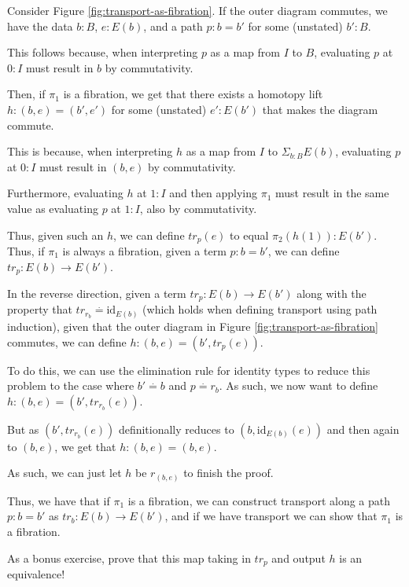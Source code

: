 \documentclass{amsart}
\theoremstyle{definition}
\newcommand{\defeq}{\ensuremath{\overset{\boldsymbol{\cdot}}{=}}}
\begin{document}
Consider Figure \ref{fig:transport-as-fibration}. If the outer diagram commutes, we have the data $b : B$, $e : E(b)$, and a path $p : b = b'$ for some (unstated) $b' : B$.

This follows because, when interpreting $p$ as a map from $I$ to $B$, evaluating $p$ at $0 : I$ must result in $b$ by commutativity.

Then, if $\pi_1$ is a fibration, we get that there exists a homotopy lift $h : (b, e) = (b', e')$ for some (unstated) $e' : E(b')$ that makes the diagram commute.

This is because, when interpreting $h$ as a map from $I$ to $\Sigma_{b : B} E(b)$, evaluating $p$ at $0 : I$ must result in $(b, e)$ by commutativity.

Furthermore, evaluating $h$ at $1 : I$ and then applying $\pi_1$ must result in the same value as evaluating $p$ at $1 : I$, also by commutativity.

Thus, given such an $h$, we can define $tr_p (e)$ to equal $\pi_2 (h (1)) : E(b')$. Thus, if $\pi_1$ is always a fibration, given a term $p : b = b'$, we can define $tr_p : E(b) \to E(b')$.

In the reverse direction, given a term $tr_p : E(b) \to E(b')$ along with the property that $tr_{r_b} \defeq \text{id}_{E(b)}$ (which holds when defining transport using path induction), given that the outer diagram in Figure \ref{fig:transport-as-fibration} commutes, we can define $h : (b, e) = (b', tr_p (e))$.

To do this, we can use the elimination rule for identity types to reduce this problem to the case where $b' \defeq b$ and $p \defeq r_b$. As such, we now want to define $h : (b, e) = (b', tr_{r_b} (e))$.

But as $(b', tr_{r_b} (e))$ definitionally reduces to $(b, \text{id}_{E(b)} (e))$ and then again to $(b, e)$, we get that $h : (b, e) = (b, e)$.

As such, we can just let $h$ be $r_{(b, e)}$ to finish the proof.

Thus, we have that if $\pi_1$ is a fibration, we can construct transport along a path $p : b = b'$ as $tr_b : E(b) \to E(b')$, and if we have transport we can show that $\pi_1$ is a fibration.

As a bonus exercise, prove that this map taking in $tr_p$ and output $h$ is an equivalence!
\end{document}
